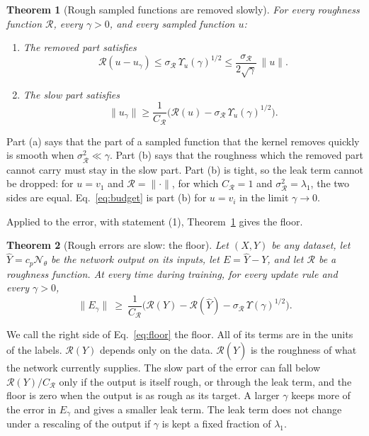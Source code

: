 \documentclass[11pt]{article}
\newtheorem{theorem}{Theorem}
\theoremstyle{definition}
\theoremstyle{remark}
\newcommand{\Net}{\mathcal{N}_\theta}    %
\newcommand{\Rgh}{\mathcal{R}}           %
\newcommand{\sR}{\sigma_{\Rgh}}
\newcommand{\CR}{C_{\Rgh}}
\begin{document}
\begin{theorem}[Rough sampled functions are removed slowly]\label{thm:fast}
For every roughness function $\Rgh$, every $\gamma > 0$, and every sampled function $u$:
\begin{enumerate}[label=(\alph*)]
\item The removed part satisfies
\begin{equation}\label{eq:fastsmooth}
\Rgh(u - u_\gamma) \le \sR\,\Upsilon_u(\gamma)^{1/2} \le \frac{\sR}{2\sqrt{\gamma}}\,\|u\|.
\end{equation}
\item The slow part satisfies
\begin{equation}\label{eq:slowlower}
\|u_\gamma\| \ge \frac{1}{\CR}\Big(\Rgh(u) - \sR\,\Upsilon_u(\gamma)^{1/2}\Big).
\end{equation}
\end{enumerate}
\end{theorem}

Part (a) says that the part of a sampled function that the kernel removes quickly is smooth when $\sR^2 \ll \gamma$.
Part (b) says that the roughness which the removed part cannot carry must stay in the slow part.
Part (b) is tight, so the leak term cannot be dropped: for $u = v_1$ and $\Rgh = \|\cdot\|$, for which $\CR = 1$ and $\sR^2 = \lambda_1$, the two sides are equal.
Eq.~\eqref{eq:budget} is part (b) for $u = v_i$ in the limit $\gamma \to 0$.

Applied to the error, with statement (1), Theorem~\ref{thm:fast} gives the floor.

\begin{theorem}[Rough errors are slow: the floor]\label{thm:floor}
Let $(X, Y)$ be any dataset, let $\hat Y = c_p\Net$ be the network output on its inputs, let $E = \hat Y - Y$, and let $\Rgh$ be a roughness function.
At every time during training, for every update rule and every $\gamma > 0$,
\begin{equation}\label{eq:floor}
\|E_\gamma\| \ \ge\ \frac{1}{\CR}\Big(\Rgh(Y) - \Rgh(\hat Y) - \sR\,\Upsilon(\gamma)^{1/2}\Big).
\end{equation}
\end{theorem}

We call the right side of Eq.~\eqref{eq:floor} the floor.
All of its terms are in the units of the labels.
$\Rgh(Y)$ depends only on the data.
$\Rgh(\hat Y)$ is the roughness of what the network currently supplies.
The slow part of the error can fall below $\Rgh(Y)/\CR$ only if the output is itself rough, or through the leak term, and the floor is zero when the output is as rough as its target.
A larger $\gamma$ keeps more of the error in $E_\gamma$ and gives a smaller leak term.
The leak term does not change under a rescaling of the output if $\gamma$ is kept a fixed fraction of $\lambda_1$.
\end{document}
